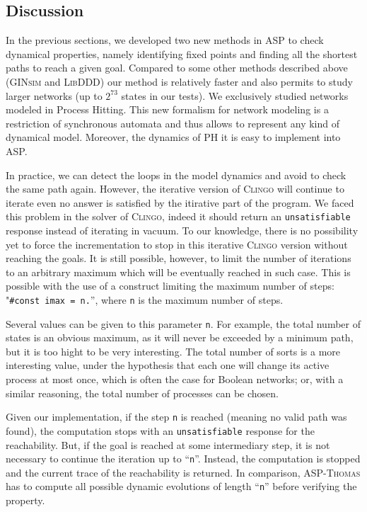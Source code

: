 \subsection{Discussion}
\label{sec:discussion}

In the previous sections,
we developed two new methods in ASP to check dynamical properties,
namely identifying fixed points and finding all the shortest paths to reach a given goal.
Compared to some other methods described above
(\textsc{GINsim} and \textsc{LibDDD}) our method is relatively faster and also permits to study larger networks
(up to $2^{73}$ states in our tests). We exclusively studied networks modeled in Process Hitting. This new formalism for network modeling is a restriction of synchronous automata and thus allows to represent any kind of dynamical model. Moreover, the dynamics of PH it is easy to implement into ASP.

In practice, we can detect the loops in the model dynamics and avoid to check the same path again.
However, the iterative version of \textsc{Clingo} will continue to iterate even no answer is satisfied by the itirative part of the program. We faced this problem in the solver of \textsc{Clingo}, indeed it should return an \texttt{unsatisfiable} response instead of iterating in vacuum.
To our knowledge, there is no possibility yet to force the incrementation to stop in this iterative \textsc{Clingo} version without reaching the goals.
It is still possible, however, to limit the number of iterations to an arbitrary
maximum which will be eventually reached in such case.
This is possible with the use of a construct limiting the maximum number of steps: "\texttt{\#const imax = n.}'',
where \texttt{n} is the maximum number of steps.

Several values can be given to this parameter \texttt{n}.
For example, the total number of states is an obvious maximum,
as it will never be exceeded by a minimum path,
but it is too hight to be very interesting.
The total number of sorts is a more interesting value,
under the hypothesis that each one will change its active process at most once,
which is often the case for Boolean networks;
or, with a similar reasoning, the total number of processes can be chosen.

Given our implementation, if the step \texttt{n} is reached (meaning no valid path was found),
the computation stops with an \texttt{unsatisfiable} response for the reachability.
But, if the goal is reached at some intermediary step, it is not necessary to continue the iteration up to ``\texttt{n}''.
Instead, the computation is stopped and the current trace of the reachability is returned.
In comparison, \textsc{ASP-Thomas} has to compute all possible dynamic evolutions of length ``\texttt{n}'' before verifying the property.
